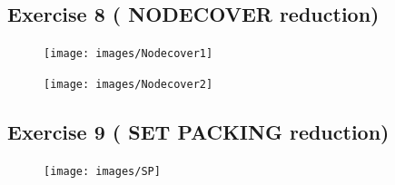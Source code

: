 \subsection{Exercise 8 ( NODECOVER reduction)}
\begin{figure}[H]
	\centerline{\texttt{[image: images/Nodecover1]}}
\end{figure}
\begin{figure}[H]
	\centerline{\texttt{[image: images/Nodecover2]}}
\end{figure}
\subsection{Exercise 9 ( SET PACKING reduction)}
\begin{figure}[H]
	\centerline{\texttt{[image: images/SP]}}
\end{figure}

